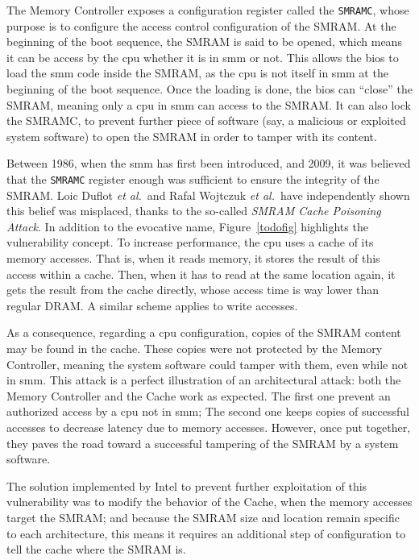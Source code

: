 The Memory Controller exposes a configuration register called the
\texttt{SMRAMC}, whose purpose is to configure the access control configuration
of the SMRAM.
%
At the beginning of the boot sequence, the SMRAM is said to be opened, which
means it can be access by the \ac{cpu} whether it is in \ac{smm} or not.
%
This allows the \ac{bios} to load the \ac{smm} code inside the SMRAM, as the \ac{cpu}
is not itself in \ac{smm} at the beginning of the boot sequence.
%
Once the loading is done, the \ac{bios} can ``close'' the SMRAM, meaning only a
\ac{cpu} in \ac{smm} can access to the SMRAM.
%
It can also lock the SMRAMC, to prevent further piece of software (say, a
malicious or exploited system software) to open the SMRAM in order to tamper
with its content.

Between 1986, when the \ac{smm} has first been
introduced, and 2009, it was believed that the \texttt{SMRAMC} register enough
was sufficient to ensure the integrity of the SMRAM.
%
Loic Duflot \emph{et al.}\,\cite{duflot2009smram} and Rafal Wojtczuk \emph{et
  al.}\,\cite{wojtczuk2009smram} have independently shown this belief was
misplaced, thanks to the so-called \emph{SMRAM Cache Poisoning Attack}.
%
In addition to the evocative name, Figure~\ref{todofig} highlights the
vulnerability concept.
%
To increase performance, the \ac{cpu} uses a cache of its memory accesses.
%
That is, when it reads memory, it stores the result of this access within a
cache.
%
Then, when it has to read at the same location again, it gets the result from
the cache directly, whose access time is way lower than regular DRAM.
%
A similar scheme applies to write accesses.

As a consequence, regarding a \ac{cpu} configuration, copies of the SMRAM
content may be found in the cache.
%
These copies were not protected by the Memory Controller, meaning the system
software could tamper with them, even while not in \ac{smm}.
%
This attack is a perfect illustration of an architectural attack:
%
both the Memory Controller and the Cache work as expected.
%
The first one prevent an authorized access by a \ac{cpu} not in \ac{smm};
%
The second one keeps copies of successful accesses to decrease latency due to
memory accesses.
%
However, once put together, they paves the road toward a successful tampering of
the SMRAM by a system software.

The solution implemented by Intel to prevent further exploitation of this
vulnerability was to modify the behavior of the Cache, when the memory accesses
target the SMRAM;
%
and because the SMRAM size and location remain specific to each architecture,
this means it requires an additional step of configuration to tell the cache
where the SMRAM is.

